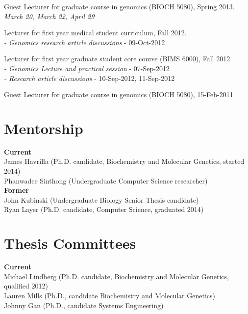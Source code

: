 \documentclass[margin,line]{cv}
\begin{document}
\begin{resume}
    Guest Lecturer for graduate course in genomics (BIOCH 5080), Spring 2013. \\
	\emph{March 20, March 22, April 29}
	
    Lecturer for first year medical student curriculum, Fall 2012. \\
	\emph{- Genomics research article discussions} - 09-Oct-2012

    \vspace{-2mm}	
    Lecturer for first year graduate student core course (BIMS 6000), Fall 2012 \\
	\emph{- Genomics Lecture and practical session} - 07-Sep-2012 \\
	\emph{- Research article discussions} - 10-Sep-2012, 11-Sep-2012
    
    \vspace{-2mm}
    Guest Lecturer for graduate course in genomics (BIOCH 5080), 15-Feb-2011   
    
    

    \section{\mysidestyle Mentorship}
    \textbf{Current} \\
    James Havrilla (Ph.D. candidate, Biochemistry and Molecular Genetics, started 2014) \\
    Phanwadee Sinthong (Undergraduate Computer Science researcher) \\

    \textbf{Former} \\
    John Kubinski (Undergraduate Biology Senior Thesis candidate)  \\
    Ryan Layer (Ph.D. candidate, Computer Science, graduated 2014) \\
    
        
    \section{\mysidestyle Thesis Committees}
    \textbf{Current} \\
    Michael Lindberg (Ph.D. candidate, Biochemistry and Molecular Genetics, qualified 2012)\\
    Lauren Mills (Ph.D., candidate Biochemistry and Molecular Genetics)\\
	Johnny Gan (Ph.D., candidate Systems Engineering)
    
    

\end{resume}
\end{document}
